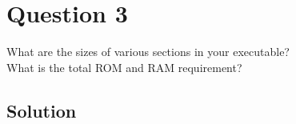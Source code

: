 \section*{Question 3}

What are the sizes of various sections in your executable?\\
What is the total ROM and RAM requirement?

\subsection*{Solution}
